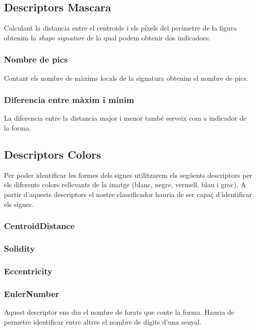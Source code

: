 \subsection{Descriptors Mascara}

Calculant la distancia entre el centroide i els píxels del perímetre de la figura obtenim la
\emph{shape signature} de la qual podem obtenir dos indicadors:

\subsubsection{Nombre de pics} Contant els nombre de màxims locals de la signatura obtenim el nombre de pics.

\subsubsection{Diferencia entre màxim i mínim} La diferencia entre la distancia major i menor també serveix com a indicador de la forma.

\subsection{Descriptors Colors}%
\label{sub:desc_col}

Per poder identificar les formes dels signes utilitzarem els següents descriptors per els diferents
colors rellevants de la imatge (blanc, negre, vermell, blau i groc). A partir d'aquests descriptors
el nostre classificador hauria de ser capaç d'identificar els signes.

\subsubsection{CentroidDistance}

\subsubsection{Solidity}

\subsubsection{Eccentricity}

\subsubsection{EulerNumber}

Aquest descriptor ens diu el nombre de forats que conte la forma. Hauria de permetre identificar entre
altres el nombre de dígits d'una senyal.

